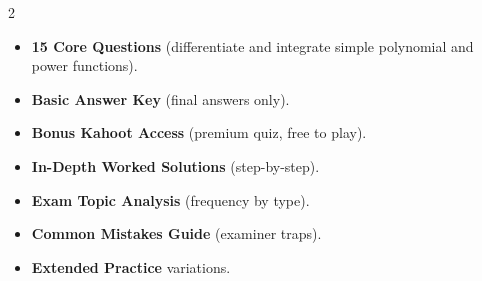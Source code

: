 \documentclass[11pt,a4paper]{article}
\newcommand{\FullReleaseDate}{April 30, 2026}
\begin{document}
\vspace{8pt}

\begin{multicols}{2}
  \begin{tcolorbox}[card, title=\sffamily\bfseries\textcolor{white}{\faHandPointDown\ TODAY (Simplified Version)}, colbacktitle=mainblue, boxed title style={sharp corners, boxrule=0pt}]
    \begin{itemize}[leftmargin=1.2em, itemsep=2pt]
      \item \small \textbf{15 Core Questions} (differentiate and integrate simple polynomial and power functions).
      \item \small \textbf{Basic Answer Key} (final answers only).
      \item \small \textbf{Bonus Kahoot Access} (premium quiz, free to play).
    \end{itemize}
  \end{tcolorbox}

  \columnbreak

  \begin{tcolorbox}[card, title=\sffamily\bfseries\textcolor{white}{\faRocket\ ON \FullReleaseDate\ (Full Upgrade)}, colbacktitle=mainblue, boxed title style={sharp corners, boxrule=0pt}]
    \begin{itemize}[leftmargin=1.2em, itemsep=2pt]
      \item \small \textbf{In-Depth Worked Solutions} (step-by-step).
      \item \small \textbf{Exam Topic Analysis} (frequency by type).
      \item \small \textbf{Common Mistakes Guide} (examiner traps).
      \item \small \textbf{Extended Practice} variations.
    \end{itemize}
  \end{tcolorbox}
\end{multicols}
\end{document}
